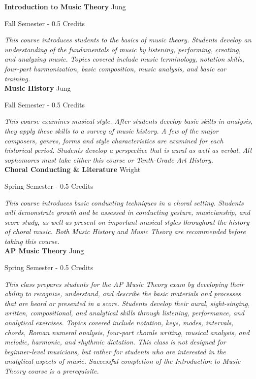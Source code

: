 \noindent\textbf{Introduction to Music Theory} \hfill Jung

\noindent Fall Semester - 0.5 Credits

\vspace{1mm}\emph{This course introduces students to the basics of music theory. Students develop an understanding of the fundamentals of music by listening, performing, creating, and analyzing music. Topics covered include music terminology, notation skills, four-part harmonization, basic composition, music analysis, and basic ear training.}\\


\noindent\textbf{Music History} \hfill Jung

\noindent Fall Semester - 0.5 Credits

\vspace{1mm}\emph{This course examines musical style. After students develop basic skills in analysis, they apply these skills to a survey of music history. A few of the major composers, genres, forms and style characteristics are examined for each historical period. Students develop a perspective that is aural as well as verbal. All sophomores must take either this course or Tenth-Grade Art History.}\\


\noindent\textbf{Choral Conducting \& Literature} \hfill Wright

\noindent Spring Semester - 0.5 Credits

\vspace{1mm}\emph{This course introduces basic conducting techniques in a choral setting. Students will demonstrate growth and be assessed in conducting gesture, musicianship, and score study, as well as present on important musical styles throughout the history of choral music. Both Music History and Music Theory are recommended before taking this course.}\\


\noindent\textbf{AP Music Theory} \hfill Jung

\noindent Spring Semester - 0.5 Credits

\vspace{1mm}\emph{This class prepares students for the AP Music Theory exam by developing their ability to recognize, understand, and describe the basic materials and processes that are heard or presented in a score. Students develop their aural, sight-singing, written, compositional, and analytical skills through listening, performance, and analytical exercises. Topics covered include notation, keys, modes, intervals, chords, Roman numeral analysis, four-part chorale writing, musical analysis, and melodic, harmonic, and rhythmic dictation. This class is not designed for beginner-level musicians, but rather for students who are interested in the analytical aspects of music. Successful completion of the Introduction to Music Theory course is a prerequisite.}\\


